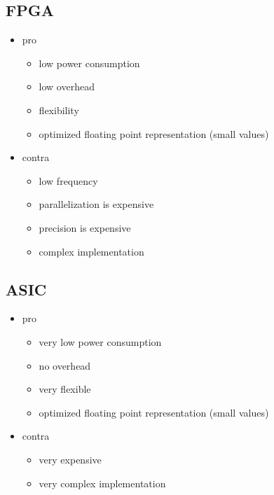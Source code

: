 \documentclass[mscthesis]{usiinfthesis}
\begin{document}
\subsection{FPGA}
\begin{itemize}
    \item pro
    \begin{itemize}
        \item low power consumption
        \item low overhead
        \item flexibility
        \item optimized floating point representation (small values)
    \end{itemize}
    \item contra
    \begin{itemize}
        \item low frequency
        \item parallelization is expensive
        \item precision is expensive
        \item complex implementation
    \end{itemize}
\end{itemize}

\subsection{ASIC}
\begin{itemize}
    \item pro
    \begin{itemize}
        \item very low power consumption
        \item no overhead
        \item very flexible
        \item optimized floating point representation (small values)
    \end{itemize}
    \item contra
    \begin{itemize}
        \item very expensive
        \item very complex implementation
    \end{itemize}
\end{itemize}
\end{document}
